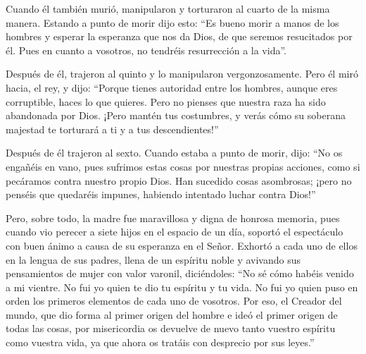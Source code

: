 Cuando él también murió, manipularon y torturaron al
cuarto de la misma manera.  Estando a punto de morir dijo
esto: ``Es bueno morir a manos de los hombres y esperar la esperanza que
nos da Dios, de que seremos resucitados por él. Pues en cuanto a
vosotros, no tendréis resurrección a la vida''.

 Después de él, trajeron al quinto y lo manipularon
vergonzosamente.  Pero él miró hacia, el rey, y dijo:
``Porque tienes autoridad entre los hombres, aunque eres corruptible,
haces lo que quieres. Pero no pienses que nuestra raza ha sido
abandonada por Dios.  ¡Pero mantén tus costumbres, y
verás cómo su soberana majestad te torturará a ti y a tus
descendientes!''

 Después de él trajeron al sexto. Cuando estaba a punto
de morir, dijo: ``No os engañéis en vano, pues sufrimos estas cosas por
nuestras propias acciones, como si pecáramos contra nuestro propio Dios.
Han sucedido cosas asombrosas;  ¡pero no penséis que
quedaréis impunes, habiendo intentado luchar contra Dios!''

 Pero, sobre todo, la madre fue maravillosa y digna de
honrosa memoria, pues cuando vio perecer a siete hijos en el espacio de
un día, soportó el espectáculo con buen ánimo a causa de su esperanza en
el Señor.  Exhortó a cada uno de ellos en la lengua de
sus padres, llena de un espíritu noble y avivando sus pensamientos de
mujer con valor varonil, diciéndoles:  ``No sé cómo
habéis venido a mi vientre. No fui yo quien te dio tu espíritu y tu
vida. No fui yo quien puso en orden los primeros elementos de cada uno
de vosotros.  Por eso, el Creador del mundo, que dio
forma al primer origen del hombre e ideó el primer origen de todas las
cosas, por misericordia os devuelve de nuevo tanto vuestro espíritu como
vuestra vida, ya que ahora os tratáis con desprecio por sus leyes.''

